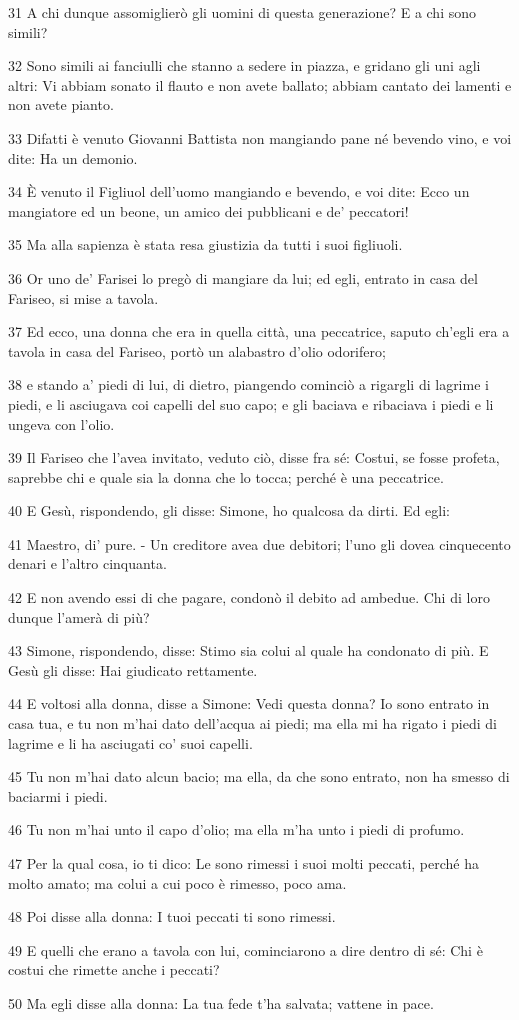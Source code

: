 \par 31 A chi dunque assomiglierò gli uomini di questa generazione? E a chi sono simili?
\par 32 Sono simili ai fanciulli che stanno a sedere in piazza, e gridano gli uni agli altri: Vi abbiam sonato il flauto e non avete ballato; abbiam cantato dei lamenti e non avete pianto.
\par 33 Difatti è venuto Giovanni Battista non mangiando pane né bevendo vino, e voi dite: Ha un demonio.
\par 34 È venuto il Figliuol dell'uomo mangiando e bevendo, e voi dite: Ecco un mangiatore ed un beone, un amico dei pubblicani e de' peccatori!
\par 35 Ma alla sapienza è stata resa giustizia da tutti i suoi figliuoli.
\par 36 Or uno de' Farisei lo pregò di mangiare da lui; ed egli, entrato in casa del Fariseo, si mise a tavola.
\par 37 Ed ecco, una donna che era in quella città, una peccatrice, saputo ch'egli era a tavola in casa del Fariseo, portò un alabastro d'olio odorifero;
\par 38 e stando a' piedi di lui, di dietro, piangendo cominciò a rigargli di lagrime i piedi, e li asciugava coi capelli del suo capo; e gli baciava e ribaciava i piedi e li ungeva con l'olio.
\par 39 Il Fariseo che l'avea invitato, veduto ciò, disse fra sé: Costui, se fosse profeta, saprebbe chi e quale sia la donna che lo tocca; perché è una peccatrice.
\par 40 E Gesù, rispondendo, gli disse: Simone, ho qualcosa da dirti. Ed egli:
\par 41 Maestro, di' pure. - Un creditore avea due debitori; l'uno gli dovea cinquecento denari e l'altro cinquanta.
\par 42 E non avendo essi di che pagare, condonò il debito ad ambedue. Chi di loro dunque l'amerà di più?
\par 43 Simone, rispondendo, disse: Stimo sia colui al quale ha condonato di più. E Gesù gli disse: Hai giudicato rettamente.
\par 44 E voltosi alla donna, disse a Simone: Vedi questa donna? Io sono entrato in casa tua, e tu non m'hai dato dell'acqua ai piedi; ma ella mi ha rigato i piedi di lagrime e li ha asciugati co' suoi capelli.
\par 45 Tu non m'hai dato alcun bacio; ma ella, da che sono entrato, non ha smesso di baciarmi i piedi.
\par 46 Tu non m'hai unto il capo d'olio; ma ella m'ha unto i piedi di profumo.
\par 47 Per la qual cosa, io ti dico: Le sono rimessi i suoi molti peccati, perché ha molto amato; ma colui a cui poco è rimesso, poco ama.
\par 48 Poi disse alla donna: I tuoi peccati ti sono rimessi.
\par 49 E quelli che erano a tavola con lui, cominciarono a dire dentro di sé: Chi è costui che rimette anche i peccati?
\par 50 Ma egli disse alla donna: La tua fede t'ha salvata; vattene in pace.


